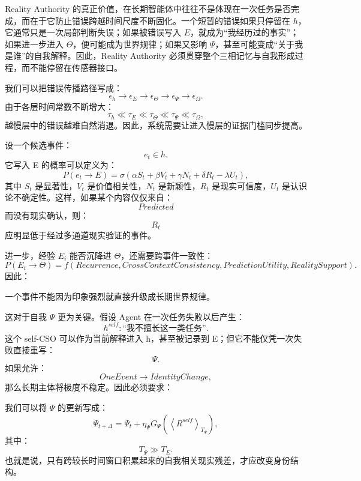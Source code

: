 Reality Authority 的真正价值，在长期智能体中往往不是体现在一次任务是否完成，而在于它防止错误跨越时间尺度不断固化。一个短暂的错误如果只停留在 $h$，它通常只是一次局部判断失误；如果被错误写入 $E$，就成为``我经历过的事实''；如果进一步进入 $\Theta$，便可能成为世界规律；如果又影响 $\Psi$，甚至可能变成``关于我是谁''的自我解释。因此，Reality Authority 必须贯穿整个三相记忆与自我形成过程，而不能停留在传感器接口。

我们可以把错误传播路径写成：
\[
\epsilon_h
\rightarrow
\epsilon_E
\rightarrow
\epsilon_\Theta
\rightarrow
\epsilon_\Psi
\rightarrow
\epsilon_\Omega.
\]
由于各层时间常数不断增大：
\[
\tau_h
\ll
\tau_E
\ll
\tau_\Theta
\ll
\tau_\Psi
\ll
\tau_\Omega,
\]
越慢层中的错误越难自然消退。因此，系统需要让进入慢层的证据门槛同步提高。

设一个候选事件：
\[
e_t\in h.
\]
它写入 E 的概率可以定义为：
\[
P(e_t\rightarrow E)
=
\sigma
\left(
\alpha S_t
+
\beta V_t
+
\gamma N_t
+
\delta R_t
-
\lambda U_t
\right),
\]
其中 $S_t$ 是显著性，$V_t$ 是价值相关性，$N_t$ 是新颖性，$R_t$ 是现实可信度，$U_t$ 是认识论不确定性。这样，如果某个内容仅仅来自：
\[
Predicted
\]
而没有现实确认，则：
\[
R_t
\]
应明显低于经过多通道现实验证的事件。

进一步，经验 $E_i$ 能否沉降进 $\Theta$，还需要跨事件一致性：
\[
P(E_i\rightarrow\Theta)
=
f(
Recurrence,
CrossContextConsistency,
PredictionUtility,
RealitySupport
).
\]
因此：
\begin{statementbox}
\centering
{}
\end{statementbox}
一个事件不能因为印象强烈就直接升级成长期世界规律。

这对于自我 $\Psi$ 更为关键。假设 Agent 在一次任务失败以后产生：
\[
h^{self}:
\text{``我不擅长这一类任务''}.
\]
这个 self-CSO 可以作为当前解释进入 h，甚至被记录到 E；但它不能仅凭一次失败直接重写：
\[
\Psi.
\]
如果允许：
\[
OneEvent
\rightarrow
IdentityChange,
\]
那么长期主体将极度不稳定。因此必须要求：
\begin{statementbox}
\centering
{}
\end{statementbox}

我们可以将 $\Psi$ 的更新写成：
\[
\Psi_{t+\Delta}
=
\Psi_t
+
\eta_\Psi
G_\Psi
\left(
\left\langle
R^{self}
\right\rangle_{T_\Psi}
\right),
\]
其中：
\[
T_\Psi\gg T_E.
\]
也就是说，只有跨较长时间窗口积累起来的自我相关现实残差，才应改变身份结构。

